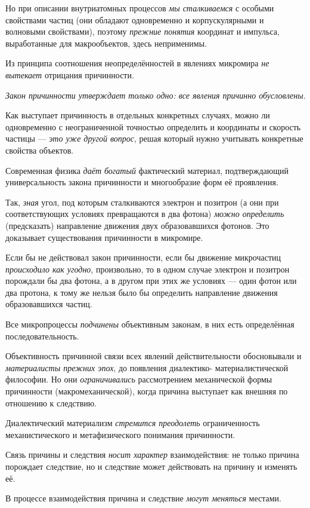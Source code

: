 \documentclass[a4paper,14pt,russian]{extreport}
\begin{document}
Но при описании внутриатомных процессов \emph{мы сталкиваемся} с особыми свойствами частиц (они обладают одновременно и корпускулярными и волновыми свойствами), поэтому \emph{прежние понятия} координат и импульса, выработанные для макрообъектов, здесь неприменимы.

Из принципа соотношения неопределённостей в явлениях микромира \emph{не вытекает} отрицания причинности.

\emph{Закон причинности утверждает только одно: все явления причинно обусловлены}.

Как выступает причинность в отдельных конкретных случаях, можно ли одновременно с неограниченной точностью определить и координаты и скорость частицы --- \emph{это уже другой вопрос}, решая который нужно учитывать конкретные свойства объектов.

Современная физика \emph{даёт богатый} фактический материал, подтверждающий универсальность закона причинности и многообразие форм её проявления.

Так, \emph{зная} угол, под которым сталкиваются электрон и позитрон (а они при соответствующих условиях превращаются в два фотона) \emph{можно определить} (предсказать) направление движения двух образовавшихся фотонов. Это доказывает существования причинности в микромире.

Если бы не действовал закон причинности, если бы движение микрочастиц \emph{происходило как угодно}, произвольно, то в одном случае электрон и позитрон порождали бы два фотона, а в другом при этих же условиях --- один фотон или два протона, к тому же нельзя было бы определить направление движения образовавшихся частиц.

Все микропроцессы \emph{подчинены} объективным законам, в них есть определённая последовательность.

Объективность причинной связи всех явлений действительности обосновывали и \emph{материалисты прежних эпох}, до появления диалектико- материалистической философии. Но они \emph{ограничивались} рассмотрением механической формы причинности (макромеханической), когда причина выступает как внешняя по отношению к следствию.

Диалектический материализм \emph{стремится преодолеть} ограниченность механистического и метафизического понимания причинности.

Связь причины и следствия \emph{носит характер} взаимодействия: не только причина порождает следствие, но и следствие может действовать на причину и изменять её.

В процессе взаимодействия причина и следствие \emph{могут меняться} местами.
\end{document}
